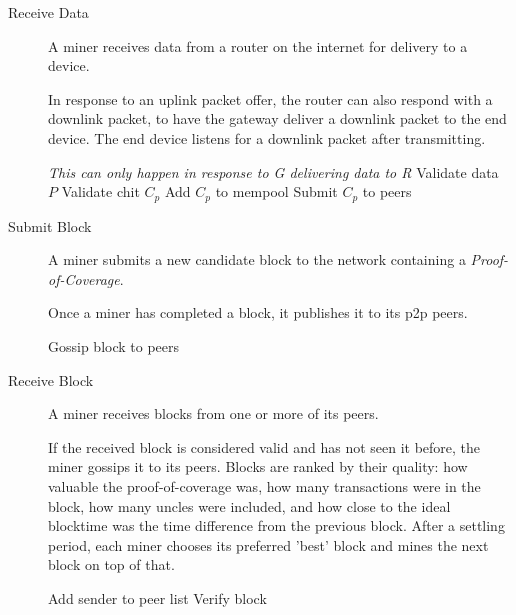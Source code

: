 \documentclass[10pt, nonatbib, nocopyrightspace, reprint]{sigplanconf}
\newenvironment{protocol}[2]{
  \begin{algorithm}[!htb]
    \DontPrintSemicolon
    \caption{#1}\label{#2}
}{
  \end{algorithm}
  \FloatBarrier
}
\begin{document}
\begin{description}
  \item [Receive Data] A miner receives data from a router on the internet for delivery to a device.

    In response to an uplink packet offer, the router can also respond with a downlink packet, to have the gateway deliver a downlink packet to the end device. The end device listens for a downlink packet after transmitting.

    \begin{protocol}{Miner Receive Router Data}{proto:miner.data.receive}

       {
        \emph{This can only happen in response to G delivering data to R}
        Validate data $P$ \;
        Validate chit $C_p$\;
         \;
        Add $C_p$ to mempool\;
        Submit $C_p$ to peers\;
      }
    \end{protocol}



  \item [Submit Block] A miner submits a new candidate block to the network containing a \emph{Proof-of-Coverage}.

    Once a miner has completed a block, it publishes it to its p2p peers.

    \begin{protocol}{Miner Block Submit}{proto:miner.block.submit}

       {
        Gossip block to peers\;
      }
    \end{protocol}


  \item [Receive Block] A miner receives blocks from one or more of its peers.

    If the received block is considered valid and has not seen it before, the miner gossips it to its peers. Blocks are ranked by their quality: how valuable the proof-of-coverage was, how many transactions were in the block, how many uncles were included, and how close to the ideal blocktime was the time difference from the previous block. After a settling period, each miner chooses its preferred 'best' block and mines the next block on top of that.

    \begin{protocol}{Miner Block Receive}{proto:miner.block.recv}

       {
        Add sender to peer list\;
        Verify block\;
      }
    \end{protocol}


\end{description}
\end{document}
